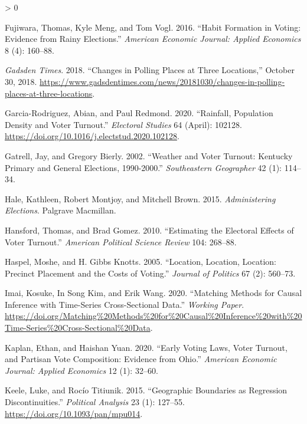 \documentclass[
  12pt,
]{article}
\newlength{\cslhangindent}
\newenvironment{CSLReferences}[2] %
 {%
  \setlength{\parindent}{0pt}
  \ifodd #1 \everypar{\setlength{\hangindent}{\cslhangindent}}\ignorespaces\fi
  \ifnum #2 > 0
  \setlength{\parskip}{#2\baselineskip}
  \fi
 }%
 {}
\begin{document}
\begin{CSLReferences}{1}{0}
\leavevmode\hypertarget{ref-Fujiwara2016}{}%
Fujiwara, Thomas, Kyle Meng, and Tom Vogl. 2016. {``Habit {Formation} in {Voting}: {Evidence} from {Rainy Elections}.''} \emph{American Economic Journal: Applied Economics} 8 (4): 160--88.

\leavevmode\hypertarget{ref-gadsdentimes2018}{}%
\emph{Gadsden Times}. 2018. {``Changes in Polling Places at Three Locations,''} October 30, 2018. \url{https://www.gadsdentimes.com/news/20181030/changes-in-polling-places-at-three-locations}.

\leavevmode\hypertarget{ref-Garcia-Rodriguez2020}{}%
Garcia-Rodriguez, Abian, and Paul Redmond. 2020. {``Rainfall, Population Density and Voter Turnout.''} \emph{Electoral Studies} 64 (April): 102128. \url{https://doi.org/10.1016/j.electstud.2020.102128}.

\leavevmode\hypertarget{ref-Gatrell2002}{}%
Gatrell, Jay, and Gregory Bierly. 2002. {``Weather and {Voter Turnout}: {Kentucky Primary} and {General Elections}, 1990-2000.''} \emph{Southeastern Geographer} 42 (1): 114--34.

\leavevmode\hypertarget{ref-Hale2015}{}%
Hale, Kathleen, Robert Montjoy, and Mitchell Brown. 2015. \emph{Administering {Elections}}. {Palgrave Macmillan}.

\leavevmode\hypertarget{ref-Hansford2010}{}%
Hansford, Thomas, and Brad Gomez. 2010. {``Estimating the {Electoral Effects} of {Voter Turnout}.''} \emph{American Political Science Review} 104: 268--88.

\leavevmode\hypertarget{ref-Haspel2005}{}%
Haspel, Moshe, and H. Gibbs Knotts. 2005. {``Location, {Location}, {Location}: {Precinct Placement} and the {Costs} of {Voting}.''} \emph{Journal of Politics} 67 (2): 560--73.

\leavevmode\hypertarget{ref-Imai2020}{}%
Imai, Kosuke, In Song Kim, and Erik Wang. 2020. {``Matching {Methods} for {Causal Inference} with {Time}-{Series Cross}-{Sectional Data}.''} \emph{Working Paper}. \url{https://doi.org/Matching\%20Methods\%20for\%20Causal\%20Inference\%20with\%20Time-Series\%20Cross-Sectional\%20Data}.

\leavevmode\hypertarget{ref-Kaplan2020}{}%
Kaplan, Ethan, and Haishan Yuan. 2020. {``Early {Voting Laws}, {Voter Turnout}, and {Partisan Vote Composition}: {Evidence} from {Ohio}.''} \emph{American Economic Journal: Applied Economics} 12 (1): 32--60.

\leavevmode\hypertarget{ref-Keele2015b}{}%
Keele, Luke, and Rocío Titiunik. 2015. {``Geographic {Boundaries} as {Regression Discontinuities}.''} \emph{Political Analysis} 23 (1): 127--55. \url{https://doi.org/10.1093/pan/mpu014}.


\end{CSLReferences}
\end{document}
